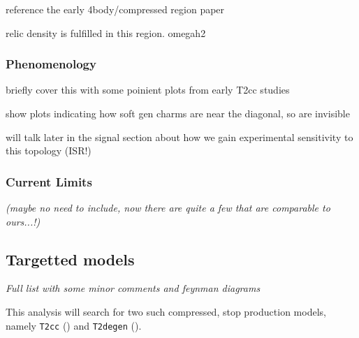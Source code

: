 reference the early 4body/compressed region paper

relic density is fulfilled in this region. omegah2

\subsubsection{Phenomenology}
briefly cover this with some poinient plots from early T2cc studies

show plots indicating how soft gen charms are near the diagonal, so are
invisible

will talk later in the signal section about how we gain experimental sensitivity
to this topology (ISR!)

\subsubsection{Current Limits}
\emph{(maybe no need to include, now there are quite a few that are comparable
to
ours...!)}

\subsection{Targetted models}
\emph{Full list with some minor comments and feynman diagrams}

This analysis will search for two such compressed, stop production models,
namely \texttt{T2cc} (\Ttwocc) and \texttt{T2degen} (\Ttwodegen).